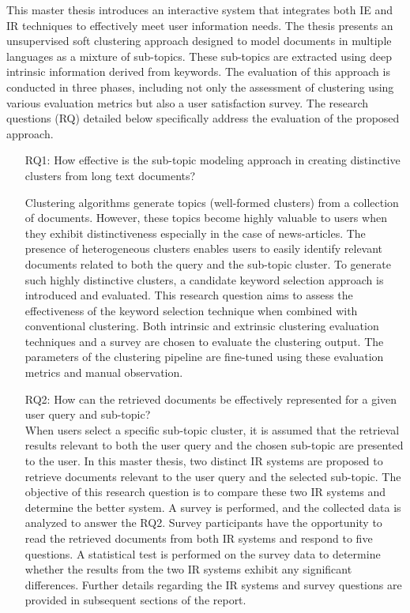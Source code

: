 This master thesis introduces an interactive system that integrates both \ac{IE} and \ac{IR} techniques to effectively meet user information needs. The thesis presents an unsupervised soft clustering approach designed to model documents in multiple languages as a mixture of sub-topics. These sub-topics are extracted using deep intrinsic information derived from keywords. The evaluation of this approach is conducted in three phases, including not only the assessment of clustering using various evaluation metrics but also a user satisfaction survey. The research questions (RQ) detailed below specifically address the evaluation of the proposed approach.

\begin{enumerate}
\item[RQ1:] How effective is the sub-topic modeling approach in creating distinctive clusters from long text documents?

Clustering algorithms generate topics (well-formed clusters) from a collection of documents. However, these topics become highly valuable to users when they exhibit distinctiveness especially in the case of news-articles. The presence of heterogeneous clusters enables users to easily identify relevant documents related to both the query and the sub-topic cluster. To generate such highly distinctive clusters, a candidate keyword selection approach is introduced and evaluated. This research question aims to assess the effectiveness of the keyword selection technique when combined with conventional clustering. Both intrinsic and extrinsic clustering evaluation techniques and a survey are chosen to evaluate the clustering output. The parameters of the clustering pipeline are fine-tuned using these evaluation metrics and manual observation.



\item[RQ2:] How can the retrieved documents be effectively represented for a given user query and sub-topic?  \\

When users select a specific sub-topic cluster, it is assumed that the retrieval results relevant to both the user query and the chosen sub-topic are presented to the user. In this master thesis, two distinct  \ac{IR} systems are proposed to retrieve documents relevant to the user query and the selected sub-topic. The objective of this research question is to compare these two \ac{IR} systems and determine the better system. A survey is performed, and the collected data is analyzed to answer the RQ2. Survey participants have the opportunity to read the retrieved documents from both \ac{IR} systems and respond to five questions. A statistical test is performed on the survey data to determine whether the results from the two \ac{IR} systems exhibit any significant differences. Further details regarding the  \ac{IR} systems and survey questions are provided in subsequent sections of the report.



\end{enumerate}
